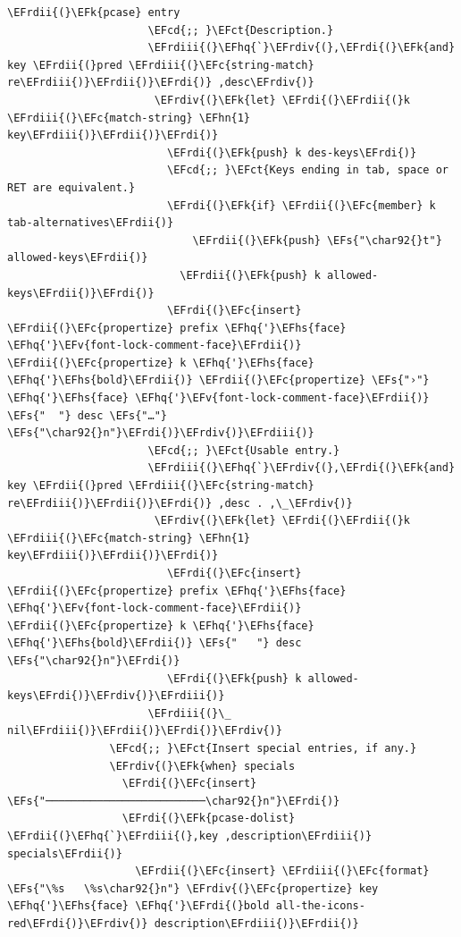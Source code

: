 \documentclass{scrartcl}
\newcommand{\EFk}[1]{\textcolor{EFk}{#1}} %
\newcommand{\EFs}[1]{\textcolor{EFs}{#1}} %
\newcommand{\EFct}[1]{\textcolor{EFct}{#1}} %
\newcommand{\EFc}[1]{\textcolor{EFc}{#1}} %
\newcommand{\EFv}[1]{\textcolor{EFv}{#1}} %
\newcommand{\EFcd}[1]{\textcolor{EFcd}{#1}} %
\newcommand{\EFhn}[1]{\textcolor{EFhn}{\textbf{#1}}} %
\newcommand{\EFhq}[1]{\textcolor{EFhq}{#1}} %
\newcommand{\EFhs}[1]{\textcolor{EFhs}{#1}} %
\newcommand{\EFrdi}[1]{\textcolor{EFrdi}{#1}} %
\newcommand{\EFrdii}[1]{\textcolor{EFrdii}{#1}} %
\newcommand{\EFrdiii}[1]{\textcolor{EFrdiii}{#1}} %
\newcommand{\EFrdiv}[1]{\textcolor{EFrdiv}{#1}} %
\begin{document}
\begin{Code}
\begin{Verbatim}[]
                    \EFrdii{(}\EFk{pcase} entry
                      \EFcd{;; }\EFct{Description.}
                      \EFrdiii{(}\EFhq{`}\EFrdiv{(},\EFrdi{(}\EFk{and} key \EFrdii{(}pred \EFrdiii{(}\EFc{string-match} re\EFrdiii{)}\EFrdii{)}\EFrdi{)} ,desc\EFrdiv{)}
                       \EFrdiv{(}\EFk{let} \EFrdi{(}\EFrdii{(}k \EFrdiii{(}\EFc{match-string} \EFhn{1} key\EFrdiii{)}\EFrdii{)}\EFrdi{)}
                         \EFrdi{(}\EFk{push} k des-keys\EFrdi{)}
                         \EFcd{;; }\EFct{Keys ending in tab, space or RET are equivalent.}
                         \EFrdi{(}\EFk{if} \EFrdii{(}\EFc{member} k tab-alternatives\EFrdii{)}
                             \EFrdii{(}\EFk{push} \EFs{"\char92{}t"} allowed-keys\EFrdii{)}
                           \EFrdii{(}\EFk{push} k allowed-keys\EFrdii{)}\EFrdi{)}
                         \EFrdi{(}\EFc{insert} \EFrdii{(}\EFc{propertize} prefix \EFhq{'}\EFhs{face} \EFhq{'}\EFv{font-lock-comment-face}\EFrdii{)} \EFrdii{(}\EFc{propertize} k \EFhq{'}\EFhs{face} \EFhq{'}\EFhs{bold}\EFrdii{)} \EFrdii{(}\EFc{propertize} \EFs{"›"} \EFhq{'}\EFhs{face} \EFhq{'}\EFv{font-lock-comment-face}\EFrdii{)} \EFs{"  "} desc \EFs{"…"} \EFs{"\char92{}n"}\EFrdi{)}\EFrdiv{)}\EFrdiii{)}
                      \EFcd{;; }\EFct{Usable entry.}
                      \EFrdiii{(}\EFhq{`}\EFrdiv{(},\EFrdi{(}\EFk{and} key \EFrdii{(}pred \EFrdiii{(}\EFc{string-match} re\EFrdiii{)}\EFrdii{)}\EFrdi{)} ,desc . ,\_\EFrdiv{)}
                       \EFrdiv{(}\EFk{let} \EFrdi{(}\EFrdii{(}k \EFrdiii{(}\EFc{match-string} \EFhn{1} key\EFrdiii{)}\EFrdii{)}\EFrdi{)}
                         \EFrdi{(}\EFc{insert} \EFrdii{(}\EFc{propertize} prefix \EFhq{'}\EFhs{face} \EFhq{'}\EFv{font-lock-comment-face}\EFrdii{)} \EFrdii{(}\EFc{propertize} k \EFhq{'}\EFhs{face} \EFhq{'}\EFhs{bold}\EFrdii{)} \EFs{"   "} desc \EFs{"\char92{}n"}\EFrdi{)}
                         \EFrdi{(}\EFk{push} k allowed-keys\EFrdi{)}\EFrdiv{)}\EFrdiii{)}
                      \EFrdiii{(}\_ nil\EFrdiii{)}\EFrdii{)}\EFrdi{)}\EFrdiv{)}
                \EFcd{;; }\EFct{Insert special entries, if any.}
                \EFrdiv{(}\EFk{when} specials
                  \EFrdi{(}\EFc{insert} \EFs{"─────────────────────────\char92{}n"}\EFrdi{)}
                  \EFrdi{(}\EFk{pcase-dolist} \EFrdii{(}\EFhq{`}\EFrdiii{(},key ,description\EFrdiii{)} specials\EFrdii{)}
                    \EFrdii{(}\EFc{insert} \EFrdiii{(}\EFc{format} \EFs{"\%s   \%s\char92{}n"} \EFrdiv{(}\EFc{propertize} key \EFhq{'}\EFhs{face} \EFhq{'}\EFrdi{(}bold all-the-icons-red\EFrdi{)}\EFrdiv{)} description\EFrdiii{)}\EFrdii{)}

\end{Verbatim}
\end{Code}
\end{document}
